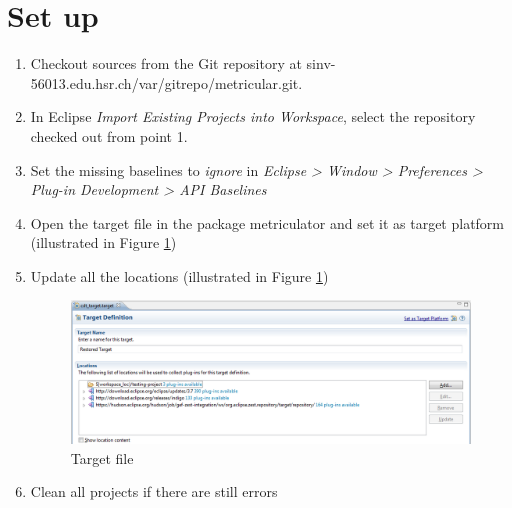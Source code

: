 \documentclass[11pt,a4paper,oneside]{scrreprt}
\begin{document}
\section{Set up}
\begin{enumerate}
\item Checkout sources from the Git repository at sinv-56013.edu.hsr.ch/var/gitrepo/metricular.git.
\item In Eclipse \textit{Import Existing Projects into Workspace}, select the repository checked out from point 1.
\item Set the missing baselines to \textit{ignore} in \textit{Eclipse > Window  > Preferences > Plug-in Development > API Baselines}
\item Open the target file in the package metriculator and set it as target platform (illustrated in Figure \ref{fig:target_manual})
\item Update all the locations (illustrated in Figure \ref{fig:target_manual})
\begin{figure}[th]
\begin{center}
\includegraphics[scale=0.5]{figures/target.png}
\end{center}
\caption{Target file}
\label{fig:target_manual}
\end{figure}
\item Clean all projects if there are still errors
\end{enumerate}
\end{document}
